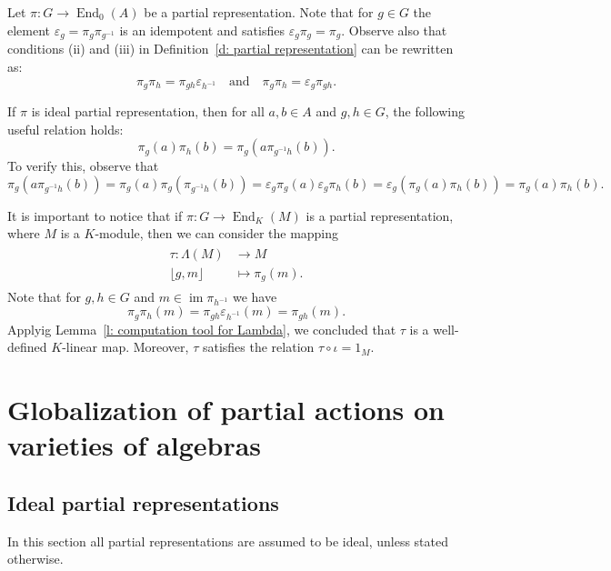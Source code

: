 \documentclass[11pt]{amsart}
\numberwithin{equation}{section}
\theoremstyle{definition}
\theoremstyle{remark}
\newcommand*{\im}{\operatorname{im}} %
\begin{document}
Let \( \pi: G \to \operatorname{End}_0(A) \) be a partial representation.  Note that for \( g \in G \) the element   \( \varepsilon_g = \pi_g \pi_{g^{-1}} \) is an idempotent and satisfies \( \varepsilon_g \pi_g = \pi_g \). Observe also that  conditions (ii) and (iii) in Definition~\ref{d: partial representation} can be rewritten as:
\[
    \pi_g \pi_h = \pi_{gh} \varepsilon_{h^{-1}} \quad \text{and} \quad \pi_g \pi_h = \varepsilon_g \pi_{gh}.
\]

If \( \pi \) is    ideal  partial representation, then for all \( a, b \in A \) and \( g, h \in G \), the following useful relation holds:
\begin{equation} \label{eq: relations of pi}
    \pi_g(a) \pi_h(b) = \pi_g(a \pi_{g^{-1}h}(b)).
\end{equation}
To verify this, observe that
\[
    \pi_g(a \pi_{g^{-1}h}(b)) = \pi_g(a) \pi_g(\pi_{g^{-1}h}(b)) = \varepsilon_g \pi_g(a) \varepsilon_g\pi_h(b) = \varepsilon_g(\pi_g(a) \pi_h(b)) = \pi_g(a) \pi_h(b).
\]


It is important to notice that if $\pi: G\to \operatorname{End}_K(M)$ is a partial representation, where $M$ is a $K$-module, then we can consider the mapping
\begin{align} \label{eq: def tau}
    \begin{split}
        \tau: \Lambda(M) &\to M \\
        \lfloor g, m \rfloor &\mapsto \pi_g(m) .
    \end{split}
\end{align}
Note that for $g,h\in G$ and $m\in \im \pi_{h^{-1}}$  we have 
$$\pi_g\pi_h(m)=\pi_{gh}\varepsilon_{h^{-1}}(m)=\pi_{gh}(m).$$
Applyig Lemma~\ref{l: computation tool for Lambda}, we  concluded that $\tau$ is a well-defined $K$-linear map. Moreover,  $\tau$ satisfies the relation $\tau\circ \iota=1_M$. 



\section{Globalization of partial actions on varieties of algebras}  


\subsection{Ideal partial representations}
In this section all partial representations are  assumed to be  ideal, unless stated otherwise.
\end{document}
